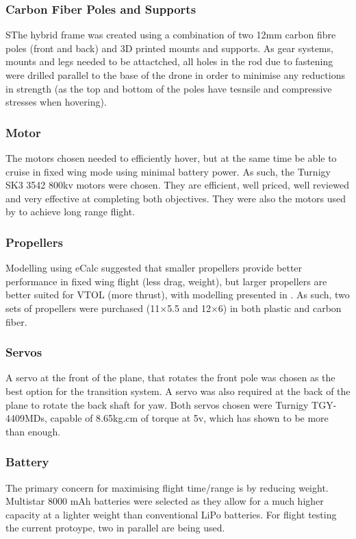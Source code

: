 		
\subsubsection*{Carbon Fiber Poles and Supports}
SThe hybrid frame was created using a combination of two 12mm carbon fibre poles (front and back) and 3D printed mounts and supports. As gear systems, mounts and legs needed to be attactched, all holes in the rod due to fastening were drilled parallel to the base of the drone in order to minimise any reductions in strength (as the top and bottom of the poles have tesnsile and compressive stresses when hovering).
	
\subsubsection*{Motor}
The motors chosen needed to efficiently hover, but at the same time be able to cruise in fixed wing mode using minimal battery power. As such, the Turnigy SK3 3542 800kv motors were chosen. They are efficient, well priced, well reviewed and very effective at completing both objectives. They were also the motors used by  to achieve long range flight.
	
\subsubsection*{Propellers}
Modelling using eCalc suggested that smaller propellers provide better performance in fixed wing flight (less drag, weight), but larger propellers are better suited for VTOL (more thrust), with modelling presented in . As such, two sets of propellers were purchased (11$\times$5.5 and 12$\times$6) in both plastic and carbon fiber.
	
\subsubsection*{Servos}
A servo at the front of the plane, that rotates the front pole was chosen as the best option for the transition system. A servo was also required at the back of the plane to rotate the back shaft for yaw. Both servos chosen were Turnigy TGY-4409MDs, capable of 8.65kg.cm of torque at 5v, which has shown to be more than enough. 
		
\subsubsection*{Battery}
The primary concern for maximising flight time/range is by reducing weight. Multistar 8000 mAh batteries were selected as they allow for a much higher capacity at a lighter weight than conventional LiPo batteries. For flight testing the current protoype, two in parallel are being used. 
	
